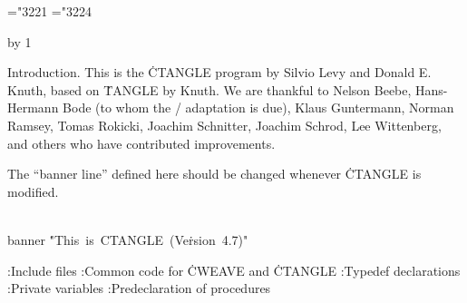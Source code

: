 






\def\hang{\hangindent 3em\indent\ignorespaces}
\def\pb{$\.|\ldots\.|$} %
\def\v{\char'174} %
\mathchardef\RA="3221 %
\mathchardef\BA="3224 %

\def\title{CTANGLE (Version 4.7)}
\def\topofcontents{\null\vfill
  \centerline{\titlefont The {\ttitlefont CTANGLE} processor}
  \vskip 15pt
  \centerline{(Version 4.7)}
  \vfill}
\def\botofcontents{\vfill\titlefalse}
\def\contentspagenumber{65}
\def\title{APPENDIX E: CTANGLE}
\let\K=\leftarrow
\pageno=\contentspagenumber \advance\pageno by 1
\let\maybe=\iftrue


Introduction.
This is the \.{CTANGLE} program by Silvio Levy and Donald E. Knuth,
based on \.{TANGLE} by Knuth.
We are thankful to
Nelson Beebe, Hans-Hermann Bode (to whom the \CPLUSPLUS/ adaptation is due),
Klaus Guntermann, Norman Ramsey, Tomas Rokicki, Joachim Schnitter,
Joachim Schrod, Lee Wittenberg, and others who have contributed improvements.

The ``banner line'' defined here should be changed whenever \.{CTANGLE}
is modified.

\Y\B\4\D\\{banner}\5
\.{"This\ is\ CTANGLE\ (Ve}\)\.{rsion\ 4.7)"}\par
\Y\B{}:Include files\X\6
\ATH\6
:Common code for \.{CWEAVE} and \.{CTANGLE}\X\6
:Typedef declarations\X\6
:Private variables\X\6
:Predeclaration of procedures\X\par
\fi

